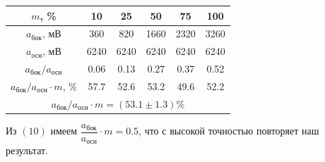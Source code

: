 \documentclass[a4paper,12pt]{article}
\begin{document}
\begin{center}
\begin{tabular}{|c|c|c|c|c|c|}
\hline
$m$, \% & 10 & 25 & 50 & 75 & 100 \\ \hline
$a_{\text{бок}}$, мВ & 360 & 820 & 1660 & 2320 & 3260 \\ \hline
$a_{\text{осн}}$, мВ & 6240 & 6240 & 6240 & 6240 & 6240 \\ \hline
$a_{\text{бок}}/a_{\text{осн}}$ & 0.06 & 0.13 & 0.27 & 0.37 & 0.52 \\ \hline
$a_{\text{бок}}/a_{\text{осн}} \cdot m$, \% & 57.7 & 52.6 & 53.2 & 49.6 & 52.2 \\ \hline
\multicolumn{6}{|c|}{$a_{\text{бок}}/a_{\text{осн}} \cdot m = (53.1 \pm 1.3)$\%} \\ \hline
\end{tabular}
\end{center}
Из $(10)$ имеем $\dfrac{a_{\text{бок}}}{a_{\text{осн}}} \cdot m = 0.5$, что с высокой точностью повторяет наш результат.
\end{document}
